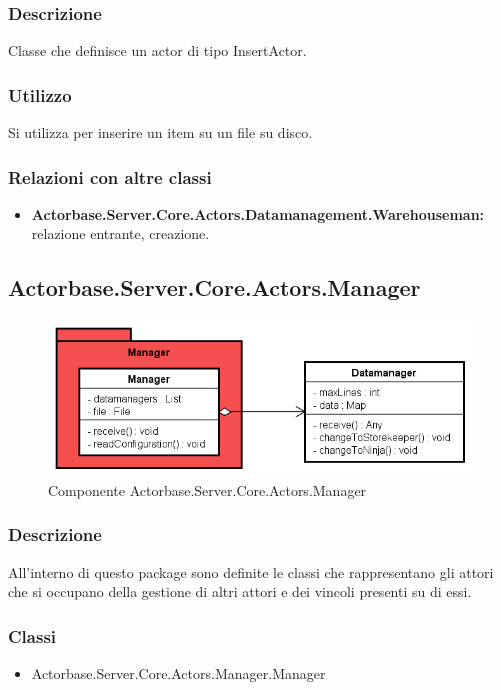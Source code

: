 \documentclass[a4paper]{article}
\begin{document}
			\subsubsection{Descrizione}
				Classe che definisce un actor di tipo InsertActor.
			\subsubsection{Utilizzo}
				Si utilizza per inserire un item su un file su disco. 
			\subsubsection{Relazioni con altre classi}
				\begin{itemize}
				    \item \textbf{Actorbase.Server.Core.Actors.Datamanagement.Warehouseman:} relazione entrante, creazione.
                \end{itemize}

		\subsection{Actorbase.Server.Core.Actors.Manager}
			\begin{figure} [H]
			\centering
			\includegraphics[scale=0.65]{Server/Package/ManagerLevel.png}
			\caption{Componente Actorbase.Server.Core.Actors.Manager}
			\end{figure}
			\subsubsection{Descrizione}
				All'interno di questo package sono definite le classi che rappresentano gli attori che si occupano della gestione di altri attori e dei vincoli presenti su di essi.
			\subsubsection{Classi}
			\begin{itemize}
				\item Actorbase.Server.Core.Actors.Manager.Manager
			\end{itemize}
			
\end{document}
